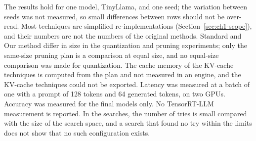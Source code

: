 The results hold for one model, TinyLlama, and one seed; the variation between seeds was not measured, so small differences between rows should not be over-read. Most techniques are simplified re-implementations (Section~\ref{sec:ch1-scope}), and their numbers are not the numbers of the original methods. Standard and Our method differ in size in the quantization and pruning experiments; only the same-size pruning plan is a comparison at equal size, and no equal-size comparison was made for quantization. The cache memory of the KV-cache techniques is computed from the plan and not measured in an engine, and the KV-cache techniques could not be exported. Latency was measured at a batch of one with a prompt of 128 tokens and 64 generated tokens, on two GPUs. Accuracy was measured for the final models only. No TensorRT-LLM measurement is reported. In the searches, the number of tries is small compared with the size of the search space, and a search that found no try within the limits does not show that no such configuration exists.
